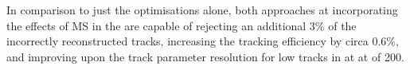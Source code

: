 {In comparison to just the \HT optimisations alone, both approaches at incorporating the effects of MS in the \KF are capable of rejecting an additional 3\% of the incorrectly reconstructed tracks, increasing the tracking efficiency by circa 0.6\%, and improving upon the track parameter resolution for low \pT tracks in \ttbar at at \PU of 200.



}
